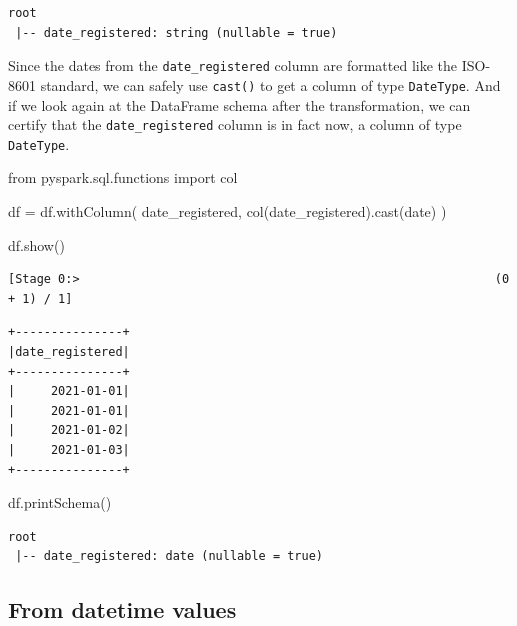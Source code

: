 \documentclass[
  11pt,
  letterpaper,
  DIV=11,
  numbers=noendperiod]{scrreprt}
\newenvironment{Shaded}{\begin{snugshade}}{\end{snugshade}}
\newcommand{\ImportTok}[1]{\textcolor[rgb]{0.00,0.46,0.62}{#1}}
\newcommand{\NormalTok}[1]{\textcolor[rgb]{0.00,0.23,0.31}{#1}}
\newcommand{\OperatorTok}[1]{\textcolor[rgb]{0.37,0.37,0.37}{#1}}
\newcommand{\StringTok}[1]{\textcolor[rgb]{0.13,0.47,0.30}{#1}}
\begin{document}
\begin{verbatim}
root
 |-- date_registered: string (nullable = true)
\end{verbatim}

Since the dates from the \texttt{date\_registered} column are formatted
like the ISO-8601 standard, we can safely use \texttt{cast()} to get a
column of type \texttt{DateType}. And if we look again at the DataFrame
schema after the transformation, we can certify that the
\texttt{date\_registered} column is in fact now, a column of type
\texttt{DateType}.

\begin{Shaded}
\begin{Highlighting}[]
\ImportTok{from}\NormalTok{ pyspark.sql.functions }\ImportTok{import}\NormalTok{ col}

\NormalTok{df }\OperatorTok{=}\NormalTok{ df.withColumn(}
    \StringTok{\textquotesingle{}date\_registered\textquotesingle{}}\NormalTok{,}
\NormalTok{    col(}\StringTok{\textquotesingle{}date\_registered\textquotesingle{}}\NormalTok{).cast(}\StringTok{\textquotesingle{}date\textquotesingle{}}\NormalTok{)}
\NormalTok{)}

\NormalTok{df.show()}
\end{Highlighting}
\end{Shaded}

\begin{verbatim}
[Stage 0:>                                                          (0 + 1) / 1]
\end{verbatim}

\begin{verbatim}
+---------------+
|date_registered|
+---------------+
|     2021-01-01|
|     2021-01-01|
|     2021-01-02|
|     2021-01-03|
+---------------+
\end{verbatim}

\begin{Shaded}
\begin{Highlighting}[]
\NormalTok{df.printSchema()}
\end{Highlighting}
\end{Shaded}

\begin{verbatim}
root
 |-- date_registered: date (nullable = true)
\end{verbatim}

\hypertarget{from-datetime-values}{%
\subsection{From datetime values}\label{from-datetime-values}}
\end{document}
